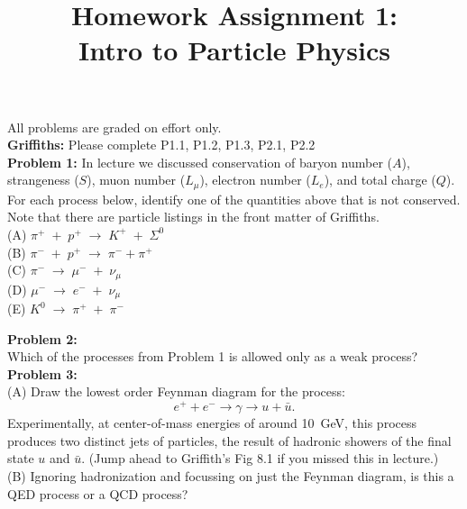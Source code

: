 \documentclass[12pt]{article}
\begin{document}
\date{\vspace{-5ex}}

\title{Homework Assignment 1: \\ Intro to Particle Physics}

\maketitle

\noindent
All problems are graded on effort only.\\

\noindent
{\bf Griffiths:} Please complete P1.1, P1.2, P1.3, P2.1, P2.2 \\

\noindent
{\bf Problem 1:} In lecture we discussed conservation of baryon number
($A$), strangeness ($S$), muon number ($L_\mu$), electron number
($L_e$), and total charge ($Q$).  For each process below, identify one
of the quantities above that is not conserved.  Note that there are
particle listings in the front matter of Griffiths.\\

\noindent
(A) $\pi^+ \; + \; p^+ \; \to \; K^+ \; + \; \Sigma^0$\\[5pt]
\noindent
(B) $\pi^- \; + \; p^+ \; \to \; \pi^- + \pi^+$\\[5pt]
\noindent
(C) $\pi^- \; \to \; \mu^- \; + \; \nu_\mu$\\[5pt]
\noindent
(D) $\mu^- \; \to \; e^- \; + \; \nu_\mu$\\[5pt]
\noindent
(E) $K^0 \; \to \; \pi^+ \; + \; \pi^-$\\[5pt]
\noindent

\noindent
{\bf Problem 2:}\\[5pt]
Which of the processes from Problem 1 is allowed only as a weak process?\\[5pt]

\noindent
{\bf Problem 3:}\\[5pt]
(A) Draw the lowest order Feynman diagram for the process:
$$e^+ + e^- \to \gamma \to u + \bar{u}.$$
Experimentally, at center-of-mass energies of around 10~\rm GeV, this
process produces two distinct jets of particles, the result of
hadronic showers of the final state $u$ and $\bar{u}$.  (Jump ahead to
Griffith's Fig 8.1 if you missed this in lecture.)\\[3pt]

\noindent
(B) Ignoring hadronization and focussing on just the Feynman diagram,
is this a QED process or a QCD process?\\[3pt]
\end{document}
